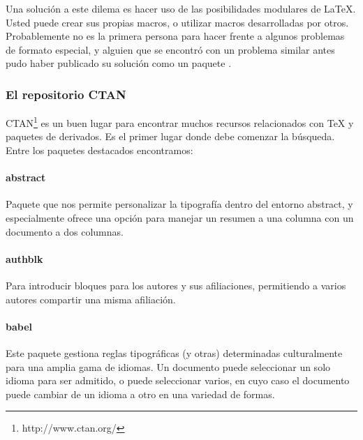 \documentclass[12pt,letterpaper,jou]{apa7} %
\begin{document}
Una solución a este dilema es hacer uso de las posibilidades modulares de LaTeX. Usted puede crear sus propias macros, o utilizar macros desarrolladas por otros. Probablemente no es la primera persona para hacer frente a algunos problemas de formato especial, y alguien que se encontró con un problema similar antes pudo haber publicado su solución como un paquete \autocite{boney_digital_1996}.

\subsubsection{El repositorio CTAN}

CTAN\footnote{http://www.ctan.org/} es un buen lugar para encontrar muchos recursos relacionados con TeX y paquetes de derivados. Es el primer lugar donde debe comenzar la búsqueda. Entre los paquetes destacados encontramos:

\paragraph{abstract} Paquete que nos permite personalizar la tipografía dentro del entorno abstract, y especialmente ofrece una opción para manejar un resumen a una columna con un documento a dos columnas.

\paragraph{authblk} Para introducir bloques para los autores y sus afiliaciones, permitiendo a varios autores compartir una misma afiliación.

\paragraph{babel} Este paquete gestiona reglas tipográficas (y otras) determinadas culturalmente para una amplia gama de idiomas. Un documento puede seleccionar un solo idioma para ser admitido, o puede seleccionar varios, en cuyo caso el documento puede cambiar de un idioma a otro en una variedad de formas.
	
\printbibliography %
\end{document}
